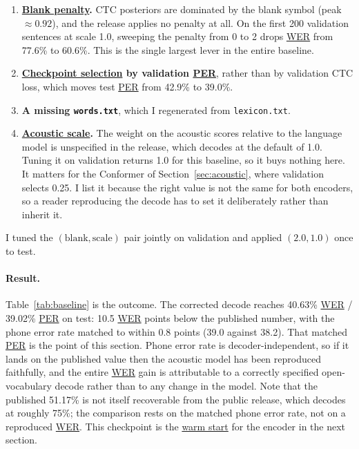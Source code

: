 \documentclass{article}
\DeclareRobustCommand{\glref}[2]{\hyperlink{gl:#1}{\textcolor{glosslink}{#2}}}
\DeclareRobustCommand{\wer}{\glref{wer}{WER}}
\DeclareRobustCommand{\per}{\glref{per}{PER}}
\begin{document}
\begin{enumerate}[itemsep=3pt,topsep=4pt]
\item \textbf{\glref{blank}{Blank penalty}.} CTC posteriors are dominated by the blank symbol (peak
$\approx 0.92$), and the release applies no penalty at all. On the first 200 validation sentences at
scale 1.0, sweeping the penalty from 0 to 2 drops \wer{} from 77.6\% to 60.6\%. This is the single
largest lever in the entire baseline.
\item \textbf{\glref{ckpt}{Checkpoint selection} by validation \per{}}, rather than by validation CTC
loss, which moves test \per{} from 42.9\% to 39.0\%.
\item \textbf{A missing \texttt{words.txt}}, which I regenerated from \texttt{lexicon.txt}.
\item \textbf{\glref{scale}{Acoustic scale}.} The weight on the acoustic scores relative to the
language model is unspecified in the release, which decodes at the default of 1.0. Tuning it on
validation returns 1.0 for this baseline, so it buys nothing here. It matters for the Conformer of
Section~\ref{sec:acoustic}, where validation selects 0.25. I list it because the right value is not
the same for both encoders, so a reader reproducing the decode has to set it deliberately rather than
inherit it.
\end{enumerate}

\noindent I tuned the $(\text{blank},\text{scale})$ pair jointly on validation and applied
$(2.0, 1.0)$ once to test.

\paragraph{Result.}
Table~\ref{tab:baseline} is the outcome. The corrected decode reaches 40.63\% \wer{} / 39.02\% \per{}
on test: 10.5 \wer{} points below the published number, with the phone error rate matched to within
0.8 points (39.0 against 38.2). That matched \per{} is the point of this section. Phone error rate is
decoder-independent, so if it lands on the published value then the acoustic model has been
reproduced faithfully, and the entire \wer{} gain is attributable to a correctly specified
open-vocabulary decode rather than to any change in the model. Note that the published 51.17\% is not
itself recoverable from the public release, which decodes at roughly 75\%; the comparison rests on the
matched phone error rate, not on a reproduced \wer{}. This checkpoint is the
\glref{warmstart}{warm start} for the encoder in the next section.
\end{document}
